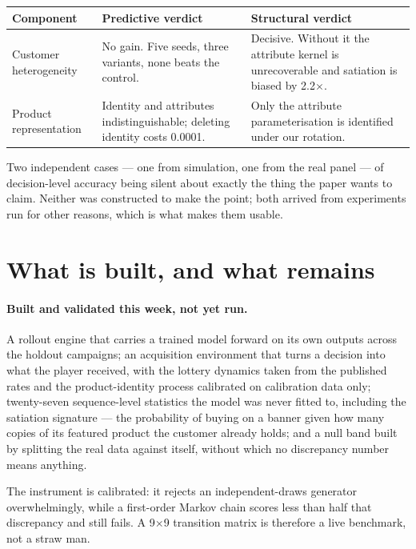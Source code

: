 \documentclass[11pt]{article}
\begin{document}
\begin{center}\small
\begin{tabular}{p{2.8cm}p{5.0cm}p{5.0cm}}
\toprule
Component & Predictive verdict & Structural verdict \\
\midrule
Customer heterogeneity & No gain. Five seeds, three variants, none beats the
control. & Decisive. Without it the attribute kernel is unrecoverable and
satiation is biased by 2.2$\times$. \\
Product representation & Identity and attributes indistinguishable; deleting
identity costs 0.0001. & Only the attribute parameterisation is identified
under our rotation. \\
\bottomrule
\end{tabular}
\end{center}

\noindent Two independent cases --- one from simulation, one from the real
panel --- of decision-level accuracy being silent about exactly the thing the
paper wants to claim. Neither was constructed to make the point; both arrived
from experiments run for other reasons, which is what makes them usable.

\section{What is built, and what remains}

\paragraph{Built and validated this week, not yet run.} A rollout engine that
carries a trained model forward on its own outputs across the holdout
campaigns; an acquisition environment that turns a decision into what the
player received, with the lottery dynamics taken from the published rates and
the product-identity process calibrated on calibration data only; twenty-seven
sequence-level statistics the model was never fitted to, including the
satiation signature --- the probability of buying on a banner given how many
copies of its featured product the customer already holds; and a null band
built by splitting the real data against itself, without which no discrepancy
number means anything.

The instrument is calibrated: it rejects an independent-draws generator
overwhelmingly, while a first-order Markov chain scores less than half that
discrepancy and still fails. A 9$\times$9 transition matrix is therefore a live
benchmark, not a straw man.
\end{document}
